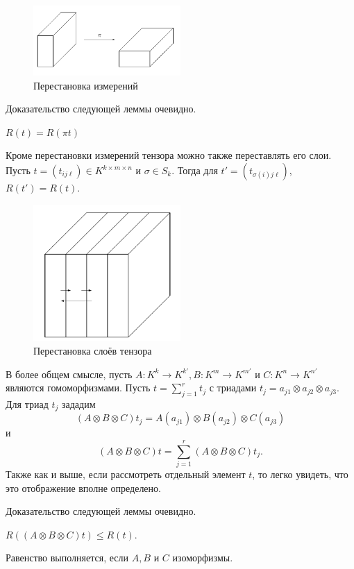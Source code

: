 \begin{figure}[H]
	\centering
    \includegraphics[width=0.5\textwidth]{figures/dimensions_permutation}
	\caption{Перестановка измерений}
	\label{fig:dimensions_permutation}
\end{figure}

Доказательство следующей леммы очевидно.
\begin{lemma}\label{lem:bi:4.3}
  $R(t) = R(\pi t)$
\end{lemma}

Кроме перестановки измерений тензора можно также переставлять его слои. Пусть $t=(t_{ij \ell}) \in K^{k \times m \times n}$ и $\sigma \in S_k$. Тогда для $t'=(t_{\sigma(i)j \ell})$, $R(t')=R(t)$.
\begin{figure}[H]
	\centering
    \includegraphics[width=0.5\textwidth]{figures/slices_permutation}
	\caption{Перестановка слоёв тензора}
	\label{fig:slices_permutation}
\end{figure}

В более общем смысле, пусть $A: K^{k} \to K^{k'}, B: K^{m} \to K^{m'}$ и $C: K^{n} \to K^{n'}$ являются гомоморфизмами. Пусть $t = \sum_{j=1}^{r} t_j$ с триадами $t_j = a_{j1} \otimes a_{j2} \otimes a_{j3}$. Для триад $t_j$ зададим
\[
	(A \otimes B \otimes C) t_j = A(a_{j1}) \otimes B(a_{j2}) \otimes C(a_{j3})
\]
и
\[
	(A \otimes B \otimes C) t = \sum_{j=1}^r (A \otimes B \otimes C) t_j.
\]
Также как и выше, если рассмотреть отдельный элемент $t$, то легко увидеть, что это отображение вполне определено.

Доказательство следующей леммы очевидно.
\begin{lemma}\label{lem:bi:4.4}
  $R((A \otimes B \otimes C)t) \leq R(t)$.
\end{lemma}
Равенство выполняется, если $A, B$ и $C$ изоморфизмы.

